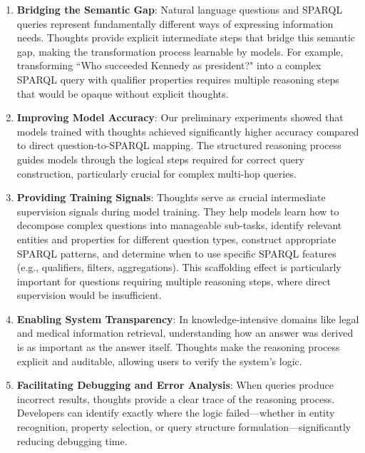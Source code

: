 \begin{enumerate}
    \item \textbf{Bridging the Semantic Gap}: Natural language questions and SPARQL queries represent fundamentally different ways of expressing information needs. Thoughts provide explicit intermediate steps that bridge this semantic gap, making the transformation process learnable by models. For example, transforming ``Who succeeded Kennedy as president?" into a complex SPARQL query with qualifier properties requires multiple reasoning steps that would be opaque without explicit thoughts.
    
    \item \textbf{Improving Model Accuracy}: Our preliminary experiments showed that models trained with thoughts achieved significantly higher accuracy compared to direct question-to-SPARQL mapping. The structured reasoning process guides models through the logical steps required for correct query construction, particularly crucial for complex multi-hop queries.
    
    \item \textbf{Providing Training Signals}: Thoughts serve as crucial intermediate supervision signals during model training. They help models learn how to decompose complex questions into manageable sub-tasks, identify relevant entities and properties for different question types, construct appropriate SPARQL patterns, and determine when to use specific SPARQL features (e.g., qualifiers, filters, aggregations). This scaffolding effect is particularly important for questions requiring multiple reasoning steps, where direct supervision would be insufficient.
    
    \item \textbf{Enabling System Transparency}: In knowledge-intensive domains like legal and medical information retrieval, understanding how an answer was derived is as important as the answer itself. Thoughts make the reasoning process explicit and auditable, allowing users to verify the system's logic.
    
    \item \textbf{Facilitating Debugging and Error Analysis}: When queries produce incorrect results, thoughts provide a clear trace of the reasoning process. Developers can identify exactly where the logic failed---whether in entity recognition, property selection, or query structure formulation---significantly reducing debugging time.
    

\end{enumerate}
